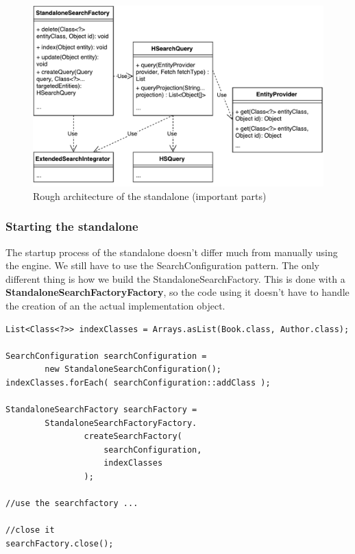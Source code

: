 \begin{figure}[ht]
	\centering
	\includegraphics[scale=0.6]{images/standalone_min_architecture.pdf}
	\caption{Rough architecture of the standalone (important parts)}
	\label{standalone_min_architecture}
\end{figure}

\subsubsection{Starting the standalone}

The startup process of the standalone doesn't differ much from manually using the engine. We still have to use the SearchConfiguration pattern. The only different thing is how we build the StandaloneSearchFactory. This is done with a \textbf{StandaloneSearchFactoryFactory}, so the code using it doesn't have to handle the creation of an the actual implementation object.
\\
\lstset{language=java}
\begin{lstlisting}[frame=htrbl, caption={Starting up the standalone}, label={lst:using_standalone.java}]
List<Class<?>> indexClasses = Arrays.asList(Book.class, Author.class);

SearchConfiguration searchConfiguration = 
		new StandaloneSearchConfiguration();
indexClasses.forEach( searchConfiguration::addClass );

StandaloneSearchFactory searchFactory = 
		StandaloneSearchFactoryFactory.
				createSearchFactory(
					searchConfiguration,
					indexClasses
				);
				
//use the searchfactory ...

//close it
searchFactory.close();
\end{lstlisting}

